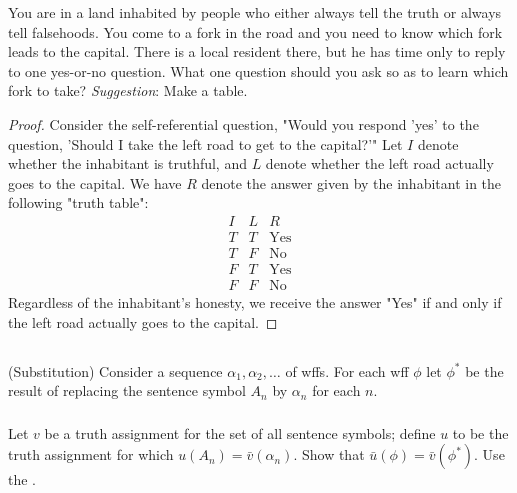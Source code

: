 \documentclass{report}
\begin{document}
  You are in a land inhabited by people who either always tell the truth or
    always tell falsehoods.
  You come to a fork in the road and you need to know which fork leads to the
    capital.
  There is a local resident there, but he has time only to reply to one
    yes-or-no question.
  What one question should you ask so as to learn which fork to take?
  \textit{Suggestion}: Make a table.

  \begin{proof}
    Consider the self-referential question,
      "Would you respond 'yes' to the question,
        'Should I take the left road to get to the capital?'"
    Let $I$ denote whether the inhabitant is truthful, and $L$ denote whether
      the left road actually goes to the capital.
    We have $R$ denote the answer given by the inhabitant in the following
      "truth table":
      $$\begin{array}{s|s|e}
        I & L & R \\
        \hline
        T & T & \text{Yes} \\
        T & F & \text{No} \\
        F & T & \text{Yes} \\
        F & F & \text{No}
      \end{array}$$
    Regardless of the inhabitant's honesty, we receive the answer "Yes" if and
      only if the left road actually goes to the capital.
  \end{proof}

\subsection{}%

  (Substitution) Consider a sequence $\alpha_1, \alpha_2, \ldots$ of wffs.
  For each wff $\phi$ let $\phi^*$ be the result of replacing the sentence
    symbol $A_n$ by $\alpha_n$ for each $n$.

\subsubsection{}%

  Let $v$ be a truth assignment for the set of all sentence symbols; define $u$
    to be the truth assignment for which $u(A_n) = \bar{v}(\alpha_n)$.
  Show that $\bar{u}(\phi) = \bar{v}(\phi^*)$.
  Use the .
\end{document}
